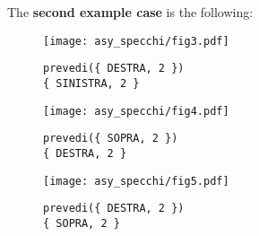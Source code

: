 \pagebreak
The \textbf{second example case} is the following:

\begin{minipage}{.33\textwidth}
	\begin{figure}[H]
		\centering\texttt{[image: asy\_specchi/fig3.pdf]}
		\caption*{\centering\texttt{prevedi(\{ DESTRA, 2 \}) \\ \{ SINISTRA, 2 \}}}
	\end{figure}
\end{minipage}
\begin{minipage}{.33\textwidth}
	\begin{figure}[H]
		\centering\texttt{[image: asy\_specchi/fig4.pdf]}
		\caption*{\centering\texttt{prevedi(\{ SOPRA, 2 \}) \\ \{ DESTRA, 2 \}}}
	\end{figure}
\end{minipage}
\begin{minipage}{.33\textwidth}
	\begin{figure}[H]
		\centering\texttt{[image: asy\_specchi/fig5.pdf]}
		\caption*{\centering\texttt{prevedi(\{ DESTRA, 2 \}) \\ \{ SOPRA, 2 \}}}
	\end{figure}
\end{minipage}
